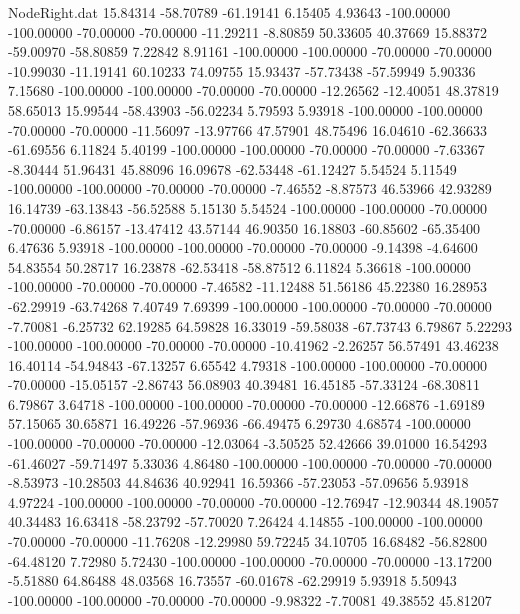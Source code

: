 \begin{filecontents}{NodeRight.dat}
  15.84314  -58.70789  -61.19141     6.15405    4.93643 -100.00000 -100.00000  -70.00000  -70.00000  -11.29211   -8.80859   50.33605   40.37669
  15.88372  -59.00970  -58.80859     7.22842    8.91161 -100.00000 -100.00000  -70.00000  -70.00000  -10.99030  -11.19141   60.10233   74.09755
  15.93437  -57.73438  -57.59949     5.90336    7.15680 -100.00000 -100.00000  -70.00000  -70.00000  -12.26562  -12.40051   48.37819   58.65013
  15.99544  -58.43903  -56.02234     5.79593    5.93918 -100.00000 -100.00000  -70.00000  -70.00000  -11.56097  -13.97766   47.57901   48.75496
  16.04610  -62.36633  -61.69556     6.11824    5.40199 -100.00000 -100.00000  -70.00000  -70.00000   -7.63367   -8.30444   51.96431   45.88096
  16.09678  -62.53448  -61.12427     5.54524    5.11549 -100.00000 -100.00000  -70.00000  -70.00000   -7.46552   -8.87573   46.53966   42.93289
  16.14739  -63.13843  -56.52588     5.15130    5.54524 -100.00000 -100.00000  -70.00000  -70.00000   -6.86157  -13.47412   43.57144   46.90350
  16.18803  -60.85602  -65.35400     6.47636    5.93918 -100.00000 -100.00000  -70.00000  -70.00000   -9.14398   -4.64600   54.83554   50.28717
  16.23878  -62.53418  -58.87512     6.11824    5.36618 -100.00000 -100.00000  -70.00000  -70.00000   -7.46582  -11.12488   51.56186   45.22380
  16.28953  -62.29919  -63.74268     7.40749    7.69399 -100.00000 -100.00000  -70.00000  -70.00000   -7.70081   -6.25732   62.19285   64.59828
  16.33019  -59.58038  -67.73743     6.79867    5.22293 -100.00000 -100.00000  -70.00000  -70.00000  -10.41962   -2.26257   56.57491   43.46238
  16.40114  -54.94843  -67.13257     6.65542    4.79318 -100.00000 -100.00000  -70.00000  -70.00000  -15.05157   -2.86743   56.08903   40.39481
  16.45185  -57.33124  -68.30811     6.79867    3.64718 -100.00000 -100.00000  -70.00000  -70.00000  -12.66876   -1.69189   57.15065   30.65871
  16.49226  -57.96936  -66.49475     6.29730    4.68574 -100.00000 -100.00000  -70.00000  -70.00000  -12.03064   -3.50525   52.42666   39.01000
  16.54293  -61.46027  -59.71497     5.33036    4.86480 -100.00000 -100.00000  -70.00000  -70.00000   -8.53973  -10.28503   44.84636   40.92941
  16.59366  -57.23053  -57.09656     5.93918    4.97224 -100.00000 -100.00000  -70.00000  -70.00000  -12.76947  -12.90344   48.19057   40.34483
  16.63418  -58.23792  -57.70020     7.26424    4.14855 -100.00000 -100.00000  -70.00000  -70.00000  -11.76208  -12.29980   59.72245   34.10705
  16.68482  -56.82800  -64.48120     7.72980    5.72430 -100.00000 -100.00000  -70.00000  -70.00000  -13.17200   -5.51880   64.86488   48.03568
  16.73557  -60.01678  -62.29919     5.93918    5.50943 -100.00000 -100.00000  -70.00000  -70.00000   -9.98322   -7.70081   49.38552   45.81207

\end{filecontents}
